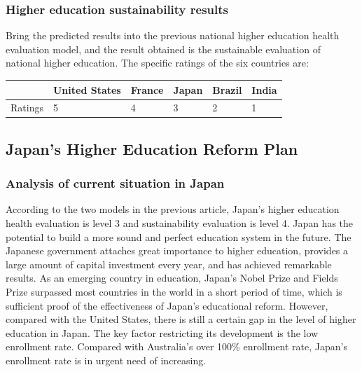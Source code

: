 \documentclass[12pt]{article}  %
\begin{document}
\subsubsection{Higher education sustainability results}

Bring the predicted results into the previous national higher education health evaluation model, and the result obtained is the sustainable evaluation of national higher education. The specific ratings of the six countries are:

\begin{table}[hbt!]
\hspace{3.3cm}
\begin{tabular}{|l|l|l|l|l|l|}
\hline
        & United States & France & Japan & Brazil & India \\ \hline
Ratings & 5             & 4      & 3     & 2      & 1     \\ \hline
\end{tabular}
\end{table}





\subsection{Japan's Higher Education Reform Plan}

\subsubsection{Analysis of current situation in Japan}

According to the two models in the previous article, Japan’s higher education health evaluation is level 3 and sustainability evaluation is level 4. Japan has the potential to build a more sound and perfect education system in the future. The Japanese government attaches great importance to higher education, provides a large amount of capital investment every year, and has achieved remarkable results. As an emerging country in education, Japan’s Nobel Prize and Fields Prize surpassed most countries in the world in a short period of time, which is sufficient proof of the effectiveness of Japan’s educational reform. However, compared with the United States, there is still a certain gap in the level of higher education in Japan. The key factor restricting its development is the low enrollment rate. Compared with Australia's over 100\% enrollment rate, Japan’s enrollment rate is in urgent need of increasing.
\end{document}
